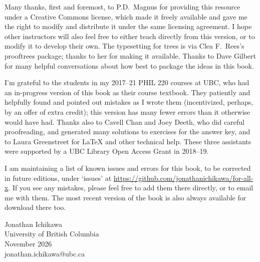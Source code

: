 Many thanks, first and foremost, to P.D.\ Magnus for providing this resource under a Creative Commons license, which made it freely available and gave me the right to modify and distribute it under the same licensing agreement. I hope other instructors will also feel free to either teach directly from this version, or to modify it to develop their own. The typesetting for trees is via Clea F.\ Rees's prooftrees package; thanks to her for making it available. Thanks to Dave Gilbert for many helpful conversations about how best to package the ideas in this book.

I'm grateful to the students in my 2017--21 PHIL 220 courses at UBC, who had an in-progress version of this book as their course textbook. They patiently and helpfully found and pointed out mistakes as I wrote them (incentivized, perhaps, by an offer of extra credit); this version has many fewer errors than it otherwise would have had. Thanks also to Cavell Chan and Joey Deeth, who did careful proofreading, and generated many solutions to exercises for the answer key, and to Laura Greenstreet for LaTeX and other technical help. These three assistants were supported by a UBC Library Open Access Grant in 2018--19.

I am maintaining a list of known issues and errors for this book, to be corrected in future editions, under `issues' at \url{https://github.com/jonathanichikawa/for-all-x}. If you see any mistakes, please feel free to add them there directly, or to email me with them. The most recent version of the book is also always available for download there too.

\begin{flushright}
Jonathan Ichikawa \\
University of British Columbia \\
November 2026 \\
jonathan.ichikawa@ubc.ca
\end{flushright}

